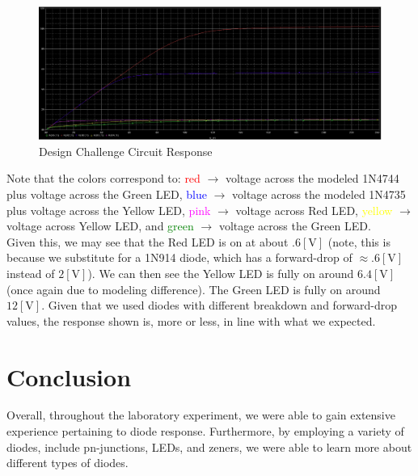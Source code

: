 \documentclass[
	letterpaper, %
	10pt, %
]{CSUniSchoolLabReport}
\begin{document}
  \begin{figure}[H]
    \centering
    \includegraphics[width=.9\textwidth]{Figures/L2F16}
    \caption{Design Challenge Circuit Response}
    \label{fig:17}
  \end{figure}

  Note that the colors correspond to: \textcolor{red}{red} $\to$ voltage across the modeled 1N4744 plus voltage across the Green LED, \textcolor{blue}{blue} $\to$ voltage across the modeled 1N4735 plus voltage across the Yellow LED, \textcolor{magenta}{pink} $\to$ voltage across Red LED, \textcolor{yellow}{yellow} $\to$ voltage across Yellow LED, and \textcolor{green}{green} $\to$ voltage across the Green LED.\\

  Given this, we may see that the Red LED is on at about $.6[\si{\volt}]$ (note, this is because we substitute for a 1N914 diode, which has a forward-drop of $\approx.6[\si{\volt}]$ instead of $2[\si{\volt}]$). We can then see the Yellow LED is fully on around $6.4[\si{\volt}]$ (once again due to modeling difference). The Green LED is fully on around $12[\si{\volt}]$. Given that we used diodes with different breakdown and forward-drop values, the response shown is, more or less, in line with what we expected.

\section{Conclusion}

Overall, throughout the laboratory experiment, we were able to gain extensive experience pertaining to diode response. Furthermore, by employing a variety of diodes, include pn-junctions, LEDs, and zeners, we were able to learn more about different types of diodes.
\end{document}
